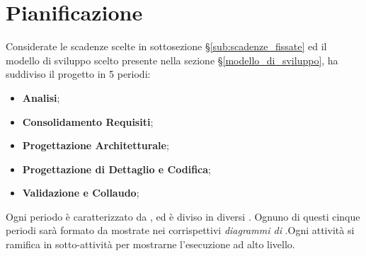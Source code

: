 \section{Pianificazione}
\label{pianificazione}
Considerate le scadenze scelte in sottosezione \S\ref{sub:scadenze_fissate} ed il modello di sviluppo scelto presente nella sezione \S\ref{modello_di_sviluppo}, {\Gruppo} ha suddiviso il progetto in 5 periodi:
\begin{itemize}
    \item \textbf{Analisi};
    \item \textbf{Consolidamento Requisiti};
    \item \textbf{Progettazione Architetturale};
    \item \textbf{Progettazione di Dettaglio e Codifica};
    \item \textbf{Validazione e Collaudo};
\end{itemize}
 Ogni periodo è caratterizzato da ,  ed è diviso in diversi . Ognuno di questi cinque periodi sarà formato da  mostrate nei corrispettivi \textit{diagrammi di }.Ogni attività si ramifica in sotto-attività per mostrarne l'esecuzione ad alto livello.


\newpage

\newpage

\newpage

\newpage

\newpage
